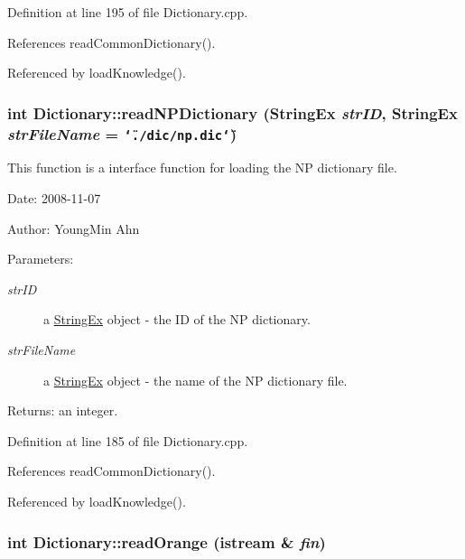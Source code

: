 Definition at line 195 of file Dictionary.cpp.

References readCommonDictionary().

Referenced by loadKnowledge().\hypertarget{classkmaOrange_1_1Dictionary_997496836f194362ab9d1f2d942b952a}{
\subsubsection[{readNPDictionary}]{\setlength{\rightskip}{0pt plus 5cm}int Dictionary::readNPDictionary ({\bf StringEx} {\em strID}, \/  {\bf StringEx} {\em strFileName} = {\tt \char`\"{}./dic/np.dic\char`\"{}})}}
\label{classkmaOrange_1_1Dictionary_997496836f194362ab9d1f2d942b952a}


This function is a interface function for loading the NP dictionary file. 

\begin{Desc}
\item[Date:]2008-11-07 \end{Desc}
\begin{Desc}
\item[Author:]YoungMin Ahn \end{Desc}
\begin{Desc}
\item[Parameters:]
\begin{description}
\item[{\em strID}]a \hyperlink{classStringEx}{StringEx} object - the ID of the NP dictionary. \item[{\em strFileName}]a \hyperlink{classStringEx}{StringEx} object - the name of the NP dictionary file. \end{description}
\end{Desc}
\begin{Desc}
\item[Returns:]an integer. \end{Desc}


Definition at line 185 of file Dictionary.cpp.

References readCommonDictionary().

Referenced by loadKnowledge().\hypertarget{classkmaOrange_1_1Dictionary_f821ce9abfd00218d4f2092d3b0dc710}{
\subsubsection[{readOrange}]{\setlength{\rightskip}{0pt plus 5cm}int Dictionary::readOrange (istream \& {\em fin})}}
\label{classkmaOrange_1_1Dictionary_f821ce9abfd00218d4f2092d3b0dc710}


